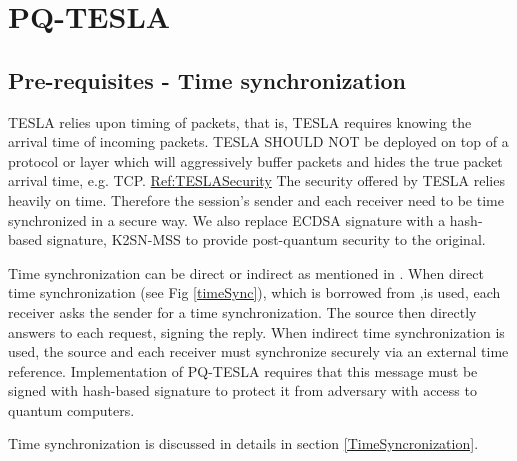 \chapter{PQ-TESLA}
\label{PQ-TESLA}



\section{Pre-requisites - Time synchronization}
TESLA relies upon timing of packets, that is, TESLA requires knowing the arrival time of incoming packets. TESLA SHOULD NOT be deployed on top of a protocol or layer which will aggressively buffer packets and hides the true packet arrival time, e.g. TCP. \href{http://users.ece.cmu.edu/~adrian/tesla/draft-ietf-msec-tesla-spec-00.txt}{Ref:TESLASecurity}
The security offered by TESLA relies heavily on time. Therefore the session's sender and each receiver need to be time synchronized in a secure way. We also replace ECDSA signature with a hash-based signature, K2SN-MSS to provide post-quantum security to the original.

Time synchronization can be direct or indirect as mentioned in \cite{TESLAuseACMNORM}. When direct time synchronization (see Fig \ref{timeSync}), which is borrowed from \cite{perrig2000efficient},is used, each receiver asks the sender for a time synchronization. The source then directly answers to each request, signing the reply. When indirect time synchronization is used, the source and each receiver must synchronize securely via an external time reference. Implementation of PQ-TESLA requires that this message must be signed with hash-based signature to protect it from adversary with access to quantum computers.

Time synchronization is discussed in  details in section \ref{TimeSyncronization}.




